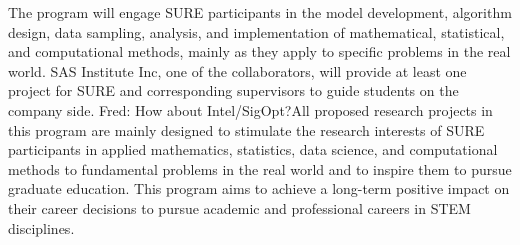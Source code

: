 \documentclass[11pt]{NSFamsart}
\newcommand{\FJHNote}[1]{{\color{blue}Fred: #1}}
\begin{document}

The program will engage SURE
participants in the model development, algorithm design, data sampling, analysis, and implementation
of mathematical, statistical, and computational methods, mainly as they apply to specific problems
in the real world.  SAS Institute Inc, one of the collaborators, will provide at least one project for SURE and corresponding supervisors to guide students on the company side. \FJHNote{How about Intel/SigOpt?}All proposed research projects in this program are mainly designed to stimulate
the research interests of SURE participants in applied mathematics, statistics, data science, and computational
methods to fundamental problems in the real world and to inspire them to pursue graduate education. This
program aims to achieve a long-term positive impact on their career decisions to pursue academic and
professional careers in STEM disciplines.



 

\end{document}
